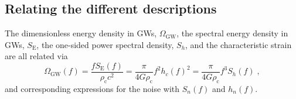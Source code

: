 \subsection{Relating the different descriptions}
The dimensionless energy density in GWs, $\Omega_{\textrm{GW}}$, the spectral energy density in GWs, $S_{\textrm{E}}$, the one-sided power spectral density, $S_{h}$, and the characteristic strain are all related via
\begin{equation}\label{eq:omega} 
\Omega_{\textrm{GW}}(f)=\frac{fS_{\textrm{E}}(f)}{\rho_{\textrm{c}}c^{2}}=\frac{\pi}{4G\rho_{\textrm{c}}}f^{2}h_{c}(f)^{2}=\frac{\pi}{4G\rho_{\textrm{c}}}f^{3}S_{h}(f)  \; ,
\end{equation}
and corresponding expressions for the noise with $S_{n}(f)$ and $h_{n}(f)$. 

